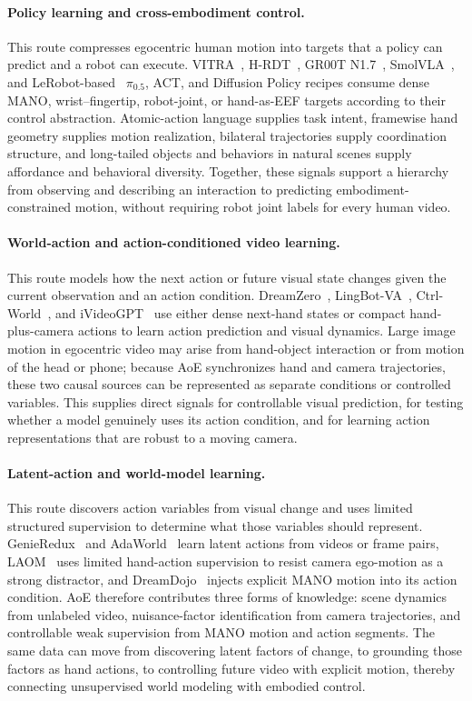 \paragraph{Policy learning and cross-embodiment control.} This route compresses egocentric human motion into targets that a policy can predict and a robot can execute.
VITRA~\cite{vitra2025}, H-RDT~\cite{hrdt2025}, GR00T N1.7~\cite{grootn172026}, SmolVLA~\cite{smolvla2025}, and LeRobot-based~\cite{cadene2026lerobot} $\pi_{0.5}$, ACT, and Diffusion Policy recipes consume dense MANO, wrist--fingertip, robot-joint, or hand-as-EEF targets according to their control abstraction.
Atomic-action language supplies task intent, framewise hand geometry supplies motion realization, bilateral trajectories supply coordination structure, and long-tailed objects and behaviors in natural scenes supply affordance and behavioral diversity.
Together, these signals support a hierarchy from observing and describing an interaction to predicting embodiment-constrained motion, without requiring robot joint labels for every human video.

\paragraph{World-action and action-conditioned video learning.} This route models how the next action or future visual state changes given the current observation and an action condition.
DreamZero~\cite{dreamzero2026}, LingBot-VA~\cite{lingbova2026}, Ctrl-World~\cite{ctrlworld2025}, and iVideoGPT~\cite{ivideogpt2024} use either dense next-hand states or compact hand-plus-camera actions to learn action prediction and visual dynamics.
Large image motion in egocentric video may arise from hand-object interaction or from motion of the head or phone; because AoE synchronizes hand and camera trajectories, these two causal sources can be represented as separate conditions or controlled variables.
This supplies direct signals for controllable visual prediction, for testing whether a model genuinely uses its action condition, and for learning action representations that are robust to a moving camera.

\paragraph{Latent-action and world-model learning.} This route discovers action variables from visual change and uses limited structured supervision to determine what those variables should represent.
GenieRedux~\cite{genieredux2024} and AdaWorld~\cite{adaworld2025} learn latent actions from videos or frame pairs, LAOM~\cite{laom2025} uses limited hand-action supervision to resist camera ego-motion as a strong distractor, and DreamDojo~\cite{dreamdojo2026} injects explicit MANO motion into its action condition.
AoE therefore contributes three forms of knowledge: scene dynamics from unlabeled video, nuisance-factor identification from camera trajectories, and controllable weak supervision from MANO motion and action segments.
The same data can move from discovering latent factors of change, to grounding those factors as hand actions, to controlling future video with explicit motion, thereby connecting unsupervised world modeling with embodied control.

